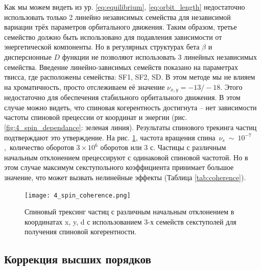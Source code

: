 \par Как мы можем видеть из ур. \ref{eq:equilibrium}, \ref{eq:orbit_length} недостаточно использовать только 2 линейно независимых семейства для независимой вариации трёх параметров орбитального движения. Таким образом, третье семейство должно быть использовано для подавления зависимости от энергетической компоненты. Но в регулярных структурах бета $\beta$ и дисперсионные $D$ функции не позволяют использовать 3 линейных независимых семейства. Введение линейно-зависимых семейств показано на параметрах твисса, где расположены семейства: SF1, SF2, SD. В этом методе мы не влияем на хроматичность, просто отслеживаем её значение $\nu_{x,y}=-13/-18$. Этого недостаточно для обеспечения стабильного орбитального движения. В этом случае можно видеть, что спиновая когерентность достигнута -- нет зависимости частоты спиновой прецессии от координат и энергии (рис. \ref{fig:4_spin_dependance}: зеленая линия). Результаты спинового трекинга частиц подтверждают это утверждение. На рис. \ref{fig:4_spin_coherence}, частота вращения спина~$\nu_s~\sim~{10}^{-7}$,~количество оборотов $3\times{10}^6$ оборотов или $3$ с. Частицы с различным начальным отклонением прецессируют с одинаковой спиновой частотой. Но в этом случае максимум секступольного коэффициента принимает большое значение, что может вызвать нелинейные эффекты (Таблица \ref{tab:coherence}).

\begin{figure}[!h]
  \centering
   \texttt{[image: 4\_spin\_coherence.png]}
   \caption{Спиновый трексинг частиц с различным начальным отклонением в координатах x, y, d с использованием 3-х семейств секступолей для получения спиновой когерентности.}
   \label{fig:4_spin_coherence}
\end{figure}

		\subsection{Коррекция высших порядков}\label{sec:EDM/Wien_filter_tracking/correction}

